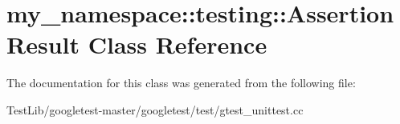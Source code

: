\hypertarget{classmy__namespace_1_1testing_1_1AssertionResult}{}\section{my\+\_\+namespace\+:\+:testing\+:\+:Assertion\+Result Class Reference}
\label{classmy__namespace_1_1testing_1_1AssertionResult}


The documentation for this class was generated from the following file\+:\begin{DoxyCompactItemize}
\item 
Test\+Lib/googletest-\/master/googletest/test/gtest\+\_\+unittest.\+cc\end{DoxyCompactItemize}
